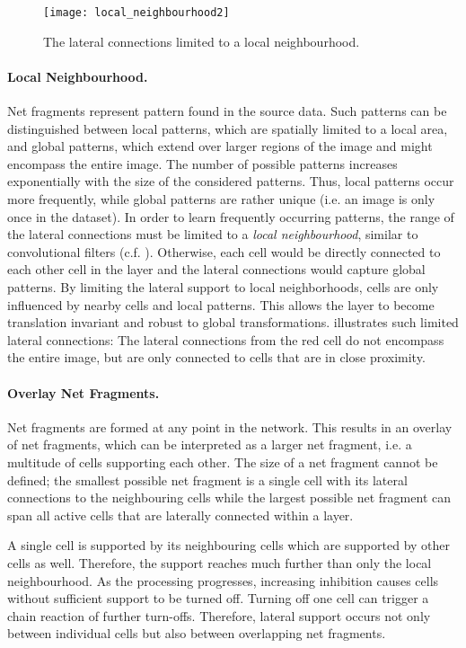 \begin{figure}[h]
    \centering
    \texttt{[image: local\_neighbourhood2]}
    \caption[Lateral connections limited to a local neighbourhood]{The lateral connections limited to a local neighbourhood.}
\end{figure}
\paragraph{Local Neighbourhood.} Net fragments represent pattern found in the source data. Such patterns can be distinguished between  local patterns, which are spatially limited to a local area, and global patterns, which extend over larger regions of the image and might encompass the entire image.
The number of possible patterns increases exponentially with the size of the considered patterns. Thus, local patterns occur more frequently, while global patterns are rather unique (i.e. an image is only once in the dataset).
In order to learn frequently occurring patterns, the range of the lateral connections must be limited to a \emph{local neighbourhood}, similar to convolutional filters (c.f. \secref{}).
Otherwise, each cell would be directly connected to each other cell in the layer and the lateral connections would capture global patterns.
By limiting the lateral support to local neighborhoods, cells are only influenced by nearby cells and local patterns. This allows the layer to become translation invariant and robust to global transformations. 
 illustrates such limited lateral connections: The lateral connections from the red cell do not encompass the entire image, but are only connected to cells that are in close proximity.

\paragraph{Overlay Net Fragments.} Net fragments are formed at any point in the network. This results in an overlay of net fragments, which can be interpreted as a larger net fragment, i.e. a multitude of cells supporting each other.
The size of a net fragment cannot be defined; the smallest possible net fragment is a single cell with its lateral connections to the neighbouring cells while the largest possible net fragment can span all active cells that are laterally connected within a layer. 

A single cell is supported by its neighbouring cells which are supported by other cells as well. Therefore, the support reaches much further than only the local neighbourhood.
As the processing progresses, increasing inhibition causes cells without sufficient support to be turned off. Turning off one cell can trigger a chain reaction of further turn-offs. Therefore, lateral support occurs not only between individual cells but also between overlapping net fragments.


